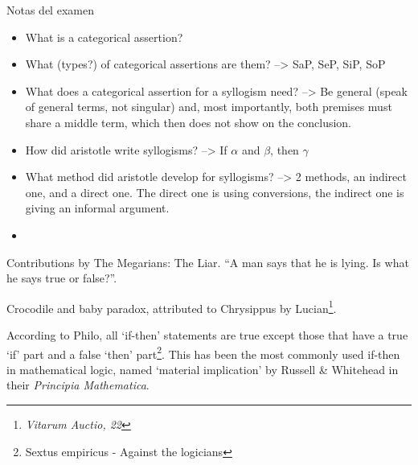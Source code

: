 \documentclass{article}
\newcommand{\cit}[2]{\cite[p.~#1~in~][]{#2}}
\begin{document}

Notas del examen
\begin{itemize}
  \item What is a categorical assertion?
  \item What (types?) of categorical assertions are them? --> SaP, SeP, SiP, SoP
  \item What does a categorical assertion for a syllogism need? --> Be
  general (speak of general terms, not singular) and, most importantly, both
  premises must share a middle term, which then does not show on the
  conclusion.
  \item How did aristotle write syllogisms? --> If \(\alpha\) and \(\beta\), then \(\gamma\)
  \item What method did aristotle develop for syllogisms? --> 2 methods, an
  indirect one, and a direct one. The direct one is using conversions, the
  indirect one is giving an informal argument.
  \item
\end{itemize}

\newpage
Contributions by The Megarians:
The Liar. \enquote{A man says that he is lying. Is what he says true or false?}.

Crocodile and baby paradox, attributed to Chrysippus by Lucian\footnote{\textit{Vitarum Auctio, 22}}.

According to Philo, all `if-then' statements are true except those that have
a true `if' part and a false `then' part\footnote{Sextus empiricus - Against
the logicians}. This has been the most commonly used if-then in mathematical
logic, named `material implication' by Russell \& Whitehead in their
\textit{Principia Mathematica}. %
\end{document}

